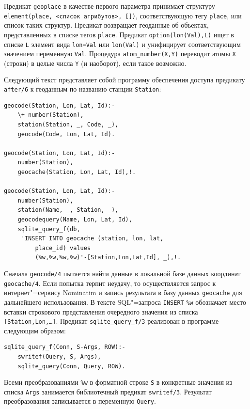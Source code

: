 \documentclass[a4paper,14pt, openany, twoside, final]{extbook} %
\begin{document}
Предикат \texttt{geoplace} в качестве первого параметра принимает структуру \texttt{element(place, <список атрибутов>, [])}, соответствующую тегу \texttt{place}, или список таких структур.  Предикат возвращает геоданные об объектах, представленных в списке тегов \texttt{place}.  Предикат \texttt{option(lon(Val),L)} ищет в списке \texttt{L} элемент вида \texttt{lon=Val} или \texttt{lon(Val)} и унифицирует соответствующим значением переменную \texttt{Val}.  Процедура \texttt{atom\_number(X,Y)} переводит атомы \texttt{X} (строки) в целые числа \texttt{Y} (и наоборот), если такое возможно.

Следующий текст представляет собой программу обеспечения доступа предикату \texttt{after/6} к геоданным по названию станции \texttt{Station}:\enlargethispage{-1em}

\begin{verbatim}
geocode(Station, Lon, Lat, Id):-
    \+ number(Station),
    station(Station, _, Code, _),
    geocode(Code, Lon, Lat, Id).

geocode(Station, Lon, Lat, Id):-
    number(Station),
    geocache(Station, Lon, Lat, Id),!.

geocode(Station, Lon, Lat, Id):-
    number(Station),
    station(Name, _, Station, _),
    geocodequery(Name, Lon, Lat, Id),
    sqlite_query_f(db,
     'INSERT INTO geocache (station, lon, lat,
         place_id) values
         (%w,%w,%w,%w)'-[Station,Lon,Lat,Id], _),!.
\end{verbatim}


Сначала \texttt{geocode/4} пытается найти данные в локальной базе данных координат \texttt{geocache/4}.  Если попытка терпит неудачу, то осуществляется запрос к интернет"=сервису \foreignlanguage{latin}{Nominatim} и запись результата в базу данных \texttt{geocache} для дальнейшего использования.  В тексте SQL"=запроса \texttt{INSERT} \texttt{\%w} обозначает место вставки строкового представления очередного значения из списка \texttt{[Station,Lon,\ldots]}.  Предикат \texttt{sqlite\_query\_f/3} реализован в программе следующим образом:

\begin{verbatim}
sqlite_query_f(Conn, S-Args, ROW):-
    swritef(Query, S, Args),
    sqlite_query(Conn, Query, ROW).
\end{verbatim}

Всеми преобразованиями \texttt{\%w} в форматной строке \texttt{S} в конкретные значения из списка \texttt{Args} занимается библиотечный предикат \texttt{swritef/3}.  Результат преобразования записывается в переменную \texttt{Query}.
\end{document}
